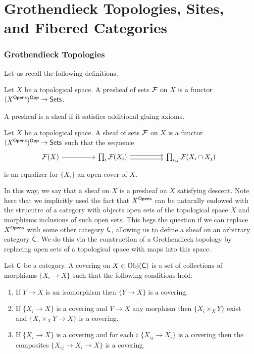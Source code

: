 \part*{Grothendieck Topologies, Sites, and Fibered Categories}\label{part: topologies sites and fibered categories}
\section{Grothendieck Topologies}\label{sec: grothendieck topologies}
Let us recall the following definitions. 
\begin{definition}[Presheaf]\label{def: presheaf on topological space}
    Let $X$ be a topological space. A presheaf of sets $\mathcal{F}$ on $X$ is a functor $(X^{\mathsf{Opens}})^{\mathsf{Opp}}\to\mathsf{Sets}$. 
\end{definition}
A presheaf is a sheaf if it satisfies additional gluing axioms. 
\begin{definition}[Sheaf]\label{def: topological sheaf}
    Let $X$ be a topological space. A sheaf of sets $\mathcal{F}$ on $X$ is a functor $(X^{\mathsf{Opens}})^{\mathsf{Opp}}\to\mathsf{Sets}$ such that the sequence 
    $$%
    \begin{tikzcd}
        {\Fcal(X)} && {\prod_{i}\Fcal(X_{i})} && {\prod_{i,j}\Fcal(X_{i}\cap X_{j})}
        \arrow[from=1-1, to=1-3]
        \arrow[shift left, from=1-3, to=1-5]
        \arrow[shift right, from=1-3, to=1-5]
    \end{tikzcd}$$
    is an equalizer for $\{X_{i}\}$ an open cover of $X$.  
\end{definition}
In this way, we say that a sheaf on $X$ is a presheaf on $X$ satisfying descent. Note here that we implicitly used the fact that $X^{\mathsf{Opens}}$ can be naturally endowed with the strucutre of a category with objects open sets of the topological space $X$ and morphisms inclusions of such open sets. This begs the question if we can replace $X^{\mathsf{Opens}}$ with some other category $\mathsf{C}$, allowing us to define a sheaf on an arbitrary category $\mathsf{C}$. We do this via the construction of a Grothendieck topology by replacing open sets of a topological space with maps into this space. 
\begin{definition}[Covering]\label{def: cover}
    Let $\mathsf{C}$ be a category. A covering on $X\in\mathrm{Obj}(\mathsf{C})$ is a set of collections of morphisms $\{X_{i}\to X\}$ such that the following conditions hold:
    \begin{enumerate}[label=(\alph*)]
        \item If $Y\to X$ is an isomorphism then $\{Y\to X\}$ is a covering.  
        \item If $\{X_{i}\to X\}$ is a covering and $Y\to X$ any morphism then $\{X_{i}\times_{X}Y\}$ exist and $\{X_{i}\times_{X}Y\to X\}$ is a covering. 
        \item If $\{X_{i}\to X\}$ is a covering and for each $i$ $\{X_{ij}\to X_{i}\}$ is a covering then the composites $\{X_{ij}\to X_{i}\to X\}$ is a covering. 
    \end{enumerate}
\end{definition}
